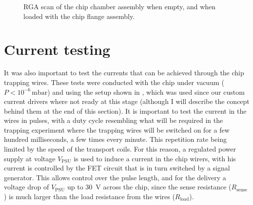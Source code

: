   \begin{figure}[htb]
  \centering
  \caption[RGA scan of empty and full chambers]{
    RGA scan of the chip chamber assembly when empty, and when loaded with the
  chip flange assembly.}
  \label{exper:fig:rga}
\end{figure}


\section{Current testing}
\label{exper:current}

It was also important to test the currents that can be achieved through the
chip trapping wires. These tests were conducted with the chip under vacuum
($P<10^{-6}\,\si{\milli\bar}$) and using the setup shown in
, which was used since our custom current drivers
where not ready at this stage (although I will describe the concept behind them
at the end of this section). It is important to test the current in the wires
in pulses, with a duty cycle resembling what will be required in the trapping
experiment where the trapping wires will be switched on for a few hundred
milliseconds, a few times every minute. This repetition rate being limited by
the speed of the transport coils. For this reason, a regulated power supply at
voltage $V_\text{PSU}$ is used to induce a current in the chip wirers, with his
current is controlled by the FET circuit that is in turn switched by a signal
generator. This allows control over the pulse length, and for the delivery a
voltage drop of $V_\text{PSU}$ up to \SI{30}{\volt} across the chip, since the
sense resistance ($R_\text{sense}$) is much larger than the load resistance
from the wires ($R_\text{load}$).

